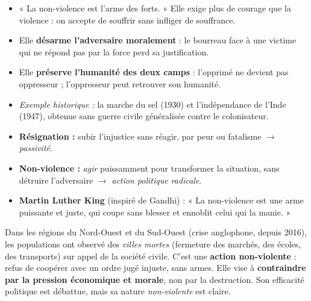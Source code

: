 \documentclass[11pt]{article}
\begin{document}
\begin{aretenir}
\begin{itemize}
\item « La non-violence est l'arme des forts. » Elle exige plus de courage que la violence : on accepte de souffrir sans infliger de souffrance.
\item Elle \textbf{désarme l'adversaire moralement} : le bourreau face à une victime qui ne répond pas par la force perd sa justification.
\item Elle \textbf{préserve l'humanité des deux camps} : l'opprimé ne devient pas oppresseur ; l'oppresseur peut retrouver son humanité.
\item \emph{Exemple historique :} la marche du sel (1930) et l'indépendance de l'Inde (1947), obtenue sans guerre civile généralisée contre le colonisateur.
\end{itemize}
\end{aretenir}

\begin{attention}
\begin{itemize}
\item \textbf{Résignation :} subir l'injustice sans réagir, par peur ou fatalisme $\rightarrow$ \emph{passivité}.
\item \textbf{Non-violence :} \emph{agir} puissamment pour transformer la situation, sans détruire l'adversaire $\rightarrow$ \emph{action politique radicale}.
\item \textbf{Martin Luther King} (inspiré de Gandhi) : « La non-violence est une arme puissante et juste, qui coupe sans blesser et ennoblit celui qui la manie. »
\end{itemize}
\end{attention}

\begin{exemplebox}
Dans les régions du Nord-Ouest et du Sud-Ouest (crise anglophone, depuis 2016), les populations ont observé des \emph{villes mortes} (fermeture des marchés, des écoles, des transports) sur appel de la société civile. C'est une \textbf{action non-violente} : refus de coopérer avec un ordre jugé injuste, sans armes. Elle vise à \textbf{contraindre par la pression économique et morale}, non par la destruction. Son efficacité politique est débattue, mais sa nature \emph{non-violente} est claire.
\end{exemplebox}
\end{document}
